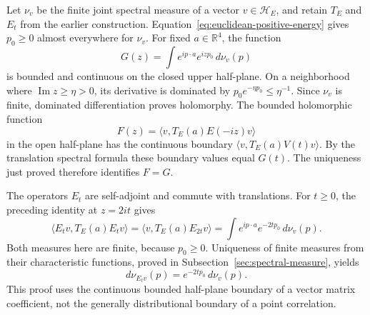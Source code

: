 Let $\nu_v$ be the finite joint spectral measure of a vector
$v\in\mathcal H_E$, and retain $T_E$ and $E_t$ from the earlier
construction. Equation~\eqref{eq:euclidean-positive-energy} gives
$p_0\geq0$ almost everywhere for $\nu_v$. For fixed $a\in\mathbb R^4$,
the function
\[
 G(z)=\int e^{ip\cdot a}e^{izp_0}\,d\nu_v(p)
\]
is bounded and continuous on the closed upper half-plane. On a neighborhood
where $\operatorname{Im}z\geq\eta>0$, its derivative is dominated by
$p_0e^{-\eta p_0}\leq\eta^{-1}$. Since $\nu_v$ is finite, dominated
differentiation proves holomorphy. The bounded holomorphic function
\[
 F(z)=\langle v,T_E(a)E(-iz)v\rangle
\]
in the open half-plane has the continuous boundary
$\langle v,T_E(a)V(t)v\rangle$. By the translation spectral formula
these boundary values equal $G(t)$. The uniqueness just proved therefore
identifies $F=G$.

The operators $E_t$ are self-adjoint and commute with translations.
For $t\geq0$, the preceding identity at $z=2it$ gives
\[
 \langle E_tv,T_E(a)E_tv\rangle
  =\langle v,T_E(a)E_{2t}v\rangle
  =\int e^{ip\cdot a}e^{-2tp_0}\,d\nu_v(p).
\]
Both measures here are finite, because $p_0\geq0$. Uniqueness of finite
measures from their characteristic functions, proved in
Subsection~\ref{sec:spectral-measure}, yields
\begin{equation}\label{eq:trace-vector-damping}
 d\nu_{E_tv}(p)=e^{-2tp_0}\,d\nu_v(p).
\end{equation}
This proof uses the continuous bounded half-plane boundary of a vector
matrix coefficient, not the generally distributional boundary of a point
correlation.


